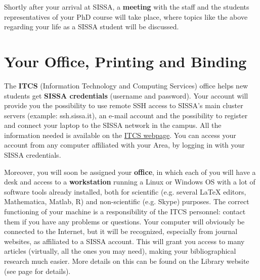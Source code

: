 \documentclass{sissavademecum}
\begin{document}
Shortly after your arrival at SISSA, a \textbf{meeting} with the staff and the students representatives of your PhD course will take place, where topics like the above regarding your life as a SISSA student will be discussed.


\section{Your Office, Printing and Binding}

The \textbf{ITCS} (Information Technology and Computing Services) office helps new students get \textbf{SISSA credentials} (username and password). Your account will provide you the possibility to use remote SSH access to SISSA's main cluster servers (example: ssh.sissa.it), an e-mail account and the possibility to register and connect your laptop to the SISSA network in the campus. All the information needed is available on the \href{https://www.itcs.sissa.it}{ITCS webpage}. You can access your account from any computer affiliated with your Area, by logging in with your SISSA credentials.

Moreover, you will soon be assigned your \textbf{office}, in which each of you will have a desk and access to a \textbf{workstation} running a Linux or Windows OS with a lot of software tools already installed, both for scientific (e.g. several LaTeX editors, Mathematica, Matlab, R) and non-scientific (e.g. Skype) purposes. The correct functioning of your machine is a responsibility of the ITCS personnel: contact them if you have any problems or questions. Your computer will obviously be connected to the Internet, but it will be recognized, especially from journal websites, as affiliated to a SISSA account. This will grant you access to many articles (virtually, all the ones you may need), making your bibliographical research much easier. More details on this can be found on the Library website (see page \pageref{sec:Library} for details).
\end{document}
